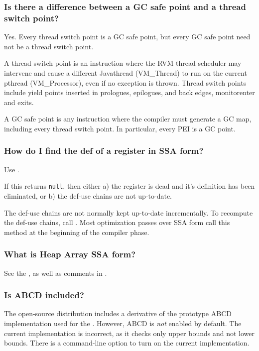 \subsubsection{Is there a difference between a GC safe point and a thread
switch point?}

Yes.  Every thread switch point is a GC safe point, but every GC safe point 
need not be a thread switch point.

A thread switch point is an instruction where the RVM thread scheduler may
intervene and cause a different Java\JavaTMFootnote thread (VM\_Thread) to
run on the current 
pthread (VM\_Processor), even if no exception is thrown.  
Thread switch points include yield points inserted in prologues, epilogues, 
and back edges, monitorenter and exits.

A GC safe point is any instruction where the compiler must generate a GC map, 
including every thread switch point.  In particular, every 
PEI is a GC point.

\subsubsection{How do I find the def of a register in SSA form?}

Use 
.

If this returns {\tt null}, then either a) the register is dead and it's definition has been eliminated, or b) the def-use chains are not up-to-date.

The def-use chains are not normally kept up-to-date incrementally.  To
recompute the def-use chains, call 
. 
Most optimization passes over SSA form call this method at 
the beginning of the compiler phase.

\subsubsection{What is Heap Array SSA form?}

See the , as well as comments in
.

\subsubsection{Is ABCD included?}

The open-source distribution includes a derivative of the prototype ABCD 
implementation used for the 
.
However, ABCD is {\em not} enabled by default.  The current implementation
is incorrect, as it checks only upper bounds and not lower bounds.
There is a command-line option to turn on the current implementation.

